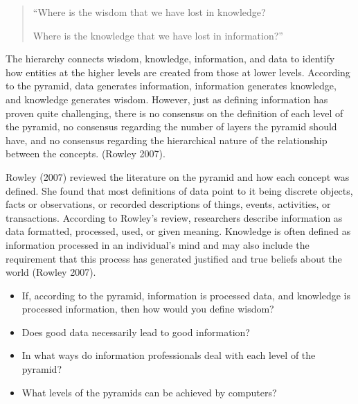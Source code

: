 \documentclass[
  letterpaper,
  DIV=11,
  numbers=noendperiod]{scrreprt}
\begin{document}
\begin{quote}
``Where is the wisdom that we have lost in knowledge?

Where is the knowledge that we have lost in information?''
\end{quote}

The hierarchy connects wisdom, knowledge, information, and data to
identify how entities at the higher levels are created from those at
lower levels. According to the pyramid, data generates information,
information generates knowledge, and knowledge generates wisdom.
However, just as defining information has proven quite challenging,
there is no consensus on the definition of each level of the pyramid, no
consensus regarding the number of layers the pyramid should have, and no
consensus regarding the hierarchical nature of the relationship between
the concepts. (Rowley 2007).

Rowley (2007) reviewed the literature on the pyramid and how each
concept was defined. She found that most definitions of data point to it
being discrete objects, facts or observations, or recorded descriptions
of things, events, activities, or transactions. According to Rowley's
review, researchers describe information as data formatted, processed,
used, or given meaning. Knowledge is often defined as information
processed in an individual's mind and may also include the requirement
that this process has generated justified and true beliefs about the
world (Rowley 2007).

\begin{tcolorbox}[enhanced jigsaw, arc=.35mm, bottomrule=.15mm, bottomtitle=1mm, breakable, colback=white, colbacktitle=quarto-callout-tip-color!10!white, colframe=quarto-callout-tip-color-frame, coltitle=black, left=2mm, leftrule=.75mm, opacityback=0, opacitybacktitle=0.6, rightrule=.15mm, title=\textcolor{quarto-callout-tip-color}{\faLightbulb}\hspace{0.5em}{Stop and reflect}, titlerule=0mm, toprule=.15mm, toptitle=1mm]

\begin{itemize}
\item
  If, according to the pyramid, information is processed data, and
  knowledge is processed information, then how would you define wisdom?
\item
  Does good data necessarily lead to good information?
\item
  In what ways do information professionals deal with each level of the
  pyramid?
\item
  What levels of the pyramids can be achieved by computers?
\end{itemize}

\end{tcolorbox}
\end{document}
